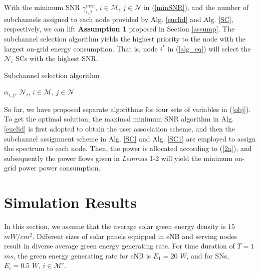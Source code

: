 \documentclass[journal,12pt,onecolumn]{IEEEtran}
\begin{document}
With the minimum SNR $\gamma_{i,j}^{min}$, $i\in\mathcal{M}$, $j\in\mathcal{N}$ in (\ref{minSNR}), and the number of subchannels assigned to each node provided by Alg. \ref{euclid} and Alg. \ref{SC}, respectively, we can lift {\bf{Assumption 1}} proposed in Section \ref{assump}. The subchannel selection algorithm yields the highest priority to the node with the largest on-grid energy consumption. That is, node $i^*$ in (\ref{alg_eq}) will select the $\mathcal{N}_i$ SCs with the highest SNR.

\begin{algorithm}
\newcommand{\Break}{\State \textbf{break} }
\caption{Subchannel selection algorithm}\label{SC1}
\begin{algorithmic}[1]
\EndWhile
{}
\LState\Return $\alpha_{i,j}$, $\mathcal{N}_i$, $i\in\mathcal{M}$, $j\in\mathcal{N}$
\end{algorithmic}
\end{algorithm}

So far, we have proposed separate algorithms for four sets of variables in (\ref{obj}). To get the optimal solution, the maximal minimum SNR algorithm in Alg. \ref{euclid} is first adopted to obtain the user association scheme, and then the subchannel assignment scheme in Alg. \ref{SC} and Alg. \ref{SC1} are employed to assign the spectrum to each node. Then, the power is allocated according to (\ref{2a}), and subsequently the power flows given in \emph{Lemmas} 1-2 will yield the minimum on-grid power power consumption. 


\section{Simulation Results}
In this section, we assume that the average solar green energy density is $15$ $mW/cm^2$. Different sizes of solar panels equipped in eNB and serving nodes result in diverse average green energy generating rate. For time duration of $T=1$ $ms$, the green energy generating rate for eNB is $E_1=20$ $W$, and for SNs, $E_i=0.5$ $W$, $i\in\mathcal{M}'$. 
\end{document}

